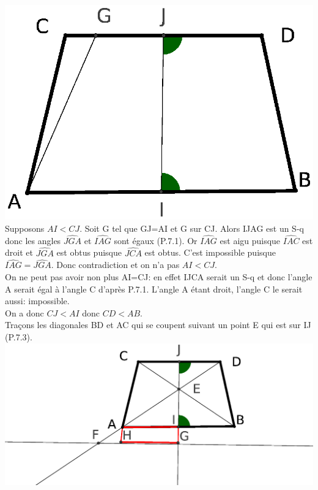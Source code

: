 \documentclass[a4paper, 12pt, twoside]{book}
\begin{document}
   \includegraphics[scale=0.7]{figures/sacc132.eps}\\
   
 Supposons $AI<CJ$. Soit G tel que GJ=AI et G sur CJ. Alors IJAG est un S-q donc les angles $\hat{JGA}$ et $\hat{IAG}$ sont égaux (P.7.1). Or  
   $\hat{IAG}$ est aigu puisque $\hat{IAC}$ est droit et $\hat{JGA}$ est obtus puisque $\hat{JCA}$ est obtus. C'est impossible puisque   $\hat{IAG}=\hat{JGA}$. Donc contradiction et on n'a pas $AI<CJ$.\\
   
   On ne peut pas avoir non plus AI=CJ: en effet IJCA serait un S-q et donc l'angle A serait égal à l'angle C d'après P.7.1. L'angle A étant droit, l'angle C le serait aussi: impossible.\\
   
   On a donc $CJ<AI$ donc $CD<AB$.\\
   
   Traçons les diagonales BD et AC qui se coupent suivant un point E qui est sur IJ (P.7.3).\\
   
    \includegraphics[scale=0.7]{figures/sacc133.eps}\\
    
\end{document}
